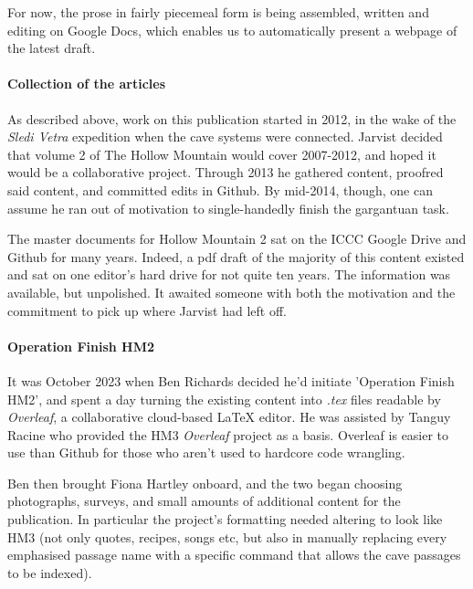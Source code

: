 \begin{tcolorbox}
\begin{fullwidth}
\begin{multicols}{2}
            For now, the prose in fairly piecemeal form is being assembled, written and editing on Google Docs, which enables us to automatically present a webpage of the latest draft.



 			\paragraph{Collection of the articles}

 			As described above, work on this publication started in 2012, in the wake of the \textit{Sledi Vetra} expedition when the cave systems were connected. Jarvist decided that volume 2 of The Hollow Mountain would cover 2007-2012, and hoped it would be a collaborative project. Through 2013 he gathered content, proofred said content, and committed edits in Github. By mid-2014, though, one can assume he ran out of motivation to single-handedly finish the gargantuan task.
 
            The master documents for Hollow Mountain 2 sat on the ICCC Google Drive and Github for many years. Indeed, a pdf draft of the majority of this content existed and sat on one editor's hard drive for not quite ten years. The information was available, but unpolished. It awaited someone with both the motivation and the commitment to pick up where Jarvist had left off.


            \paragraph{Operation Finish HM2}
            
            It was October 2023 when Ben Richards decided he'd initiate 'Operation Finish HM2', and spent a day turning the existing content into \textit{.tex} files readable by \textit{Overleaf}, a collaborative cloud-based LaTeX editor. He was assisted by Tanguy Racine who provided the HM3 \textit{Overleaf} project as a basis. Overleaf is easier to use than Github for those who aren't used to hardcore code wrangling.

            Ben then brought Fiona Hartley onboard, and the two began choosing photographs, surveys, and small amounts of additional content for the publication. In particular the project's formatting needed altering to look like HM3 (not only quotes, recipes, songs etc, but also in manually replacing every emphasised passage name with a specific command that allows the cave passages to be indexed).


\end{multicols}
\end{fullwidth}
\end{tcolorbox}
